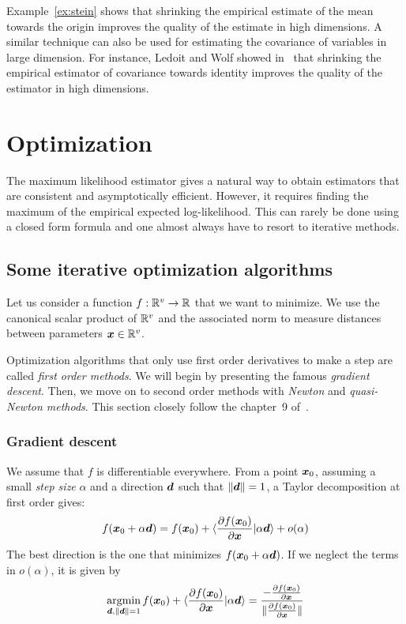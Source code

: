Example~\ref{ex:stein} shows that shrinking the empirical estimate of the mean towards the
origin improves the quality of the estimate in high dimensions. A similar technique can also be used for
estimating the covariance of variables in large dimension. For instance, Ledoit
and Wolf showed in~\cite{ledoit2004well} that shrinking the empirical estimator
of covariance towards identity improves the quality of the estimator in high dimensions.

\section{Optimization}
\label{sec:optimintro}
The maximum likelihood estimator gives a natural way to obtain estimators that
are consistent and asymptotically efficient.
However, it requires finding the maximum of the empirical expected
log-likelihood.
This can rarely be done using a closed form formula and one almost always have
to resort to iterative methods.


\subsection{Some iterative optimization algorithms}
Let us consider a function $f: \mathbb{R}^v \rightarrow \mathbb{R}$ that we
want to minimize. We use the canonical scalar product of $\mathbb{R}^v$ and the
associated norm to measure distances between parameters $\boldsymbol{x} \in \mathbb{R}^v$.


Optimization algorithms that only use first order derivatives to make a step are
called \emph{first order methods}. We will begin by presenting the famous
\emph{gradient descent}. Then, we move on to second order methods with \emph{Newton} and
\emph{quasi-Newton methods}. This section closely follow the chapter~9 of~\cite{boyd2004convex}.

\subsubsection{Gradient descent}
\label{sec:gd}
We assume that $f$ is differentiable everywhere.
From a point $\boldsymbol{x}_0$, assuming a small \emph{step size} $\alpha$ and a direction
$\boldsymbol{d}$ such that $\|\boldsymbol{d}\| = 1$, a Taylor decomposition at first order gives:
\begin{align}
f(\boldsymbol{x}_0 + \alpha \boldsymbol{d}) = f(\boldsymbol{x}_0) + \langle \frac{ \partial f(\boldsymbol{x}_0)}{\partial \boldsymbol{x}} | \alpha \boldsymbol{d} \rangle + o(\alpha) 
\end{align}
The best direction is the one that minimizes $f(\boldsymbol{x}_0 + \alpha \boldsymbol{d})$. If we
neglect the terms in $o(\alpha)$, it is given by
\begin{align}
  \operatorname*{argmin}_{\boldsymbol{d}, \|\boldsymbol{d}\| = 1} f(\boldsymbol{x}_0) + \langle \frac{ \partial f(\boldsymbol{x}_0)}{\partial \boldsymbol{x}} | \alpha \boldsymbol{d} \rangle = \frac{-\frac{ \partial f(\boldsymbol{x}_0)}{\partial \boldsymbol{x}}}{\|\frac{ \partial f(\boldsymbol{x}_0)}{\partial \boldsymbol{x}}\|}
\end{align}

